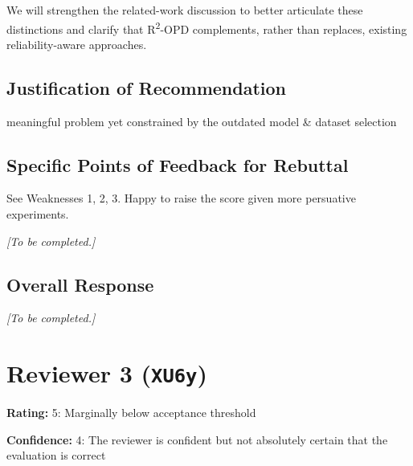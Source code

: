\documentclass[11pt,a4paper]{article}
\begin{document}
\begin{enumerate}
\begin{responsebox}[frametitle={Response to W5}]
We will strengthen the related-work discussion to better articulate these distinctions and clarify that R\textsuperscript{2}-OPD complements, rather than replaces, existing reliability-aware approaches.
\end{responsebox}

\end{enumerate}

\subsection*{Justification of Recommendation}
meaningful problem yet constrained by the outdated model \& dataset selection

\subsection*{Specific Points of Feedback for Rebuttal}
See Weaknesses 1, 2, 3. Happy to raise the score given more persuative experiments.

\par{}
\begin{responsebox}[frametitle={Response to Q1},nobreak=true]
\textit{[To be completed.]}\par\vspace{1em}
\end{responsebox}

\subsection*{Overall Response}
\par{}
\begin{responsebox}[frametitle={Overall Response to Reviewer 2 (4R1c)},nobreak=true]
\textit{[To be completed.]}\par\vspace{1em}
\end{responsebox}



\clearpage

\section{Reviewer 3 (\texttt{XU6y})}
\label{reviewer:3}
\noindent\textbf{Rating:} 5: Marginally below acceptance threshold\par
\noindent\textbf{Confidence:} 4: The reviewer is confident but not absolutely certain that the evaluation is correct
\end{document}
